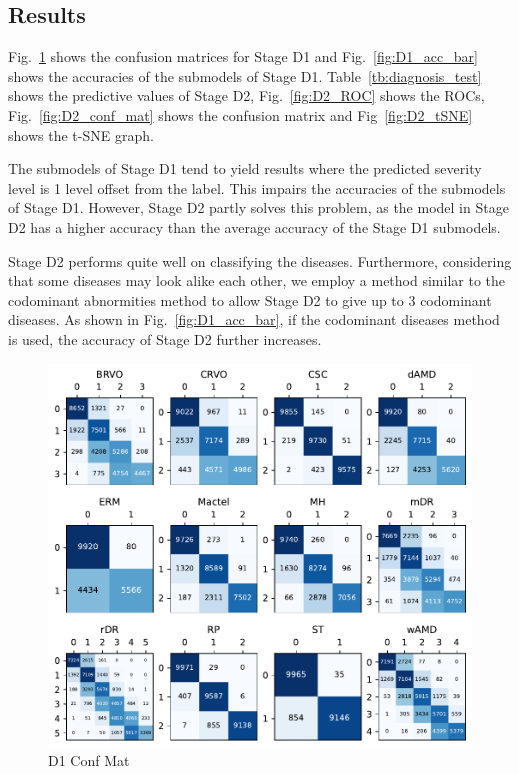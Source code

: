 \documentclass{article}
\begin{document}
	
	\subsection{Results}
	
	Fig.~\ref{fig:D1_conf_mat} shows the confusion matrices for Stage D1 and Fig.~\ref{fig:D1_acc_bar} shows the accuracies of the submodels of Stage D1. Table~\ref{tb:diagnosis_test} shows the predictive values of Stage D2, Fig.~\ref{fig:D2_ROC} shows the ROCs, Fig.~\ref{fig:D2_conf_mat} shows the confusion matrix and Fig~\ref{fig:D2_tSNE} shows the t-SNE graph.
	
	The submodels of Stage D1 tend to yield results where the predicted severity level is 1 level offset from the label. This impairs the accuracies of the submodels of Stage D1. However, Stage D2 partly solves this problem, as the model in Stage D2 has a higher accuracy than the average accuracy of the Stage D1 submodels. 
	
	Stage D2 performs quite well on classifying the diseases. Furthermore, considering that some diseases may look alike each other, we employ a method similar to the codominant abnormities method to allow Stage D2 to give up to 3 codominant diseases. As shown in Fig.~\ref{fig:D1_acc_bar}, if the codominant diseases method is used, the accuracy of Stage D2 further increases. 
	
	\begin{figure}[htbp]
		\centering
		\includegraphics[width=\linewidth]{Figs/diagnosis1_confusion_matrix.pdf}
		\caption{D1 Conf Mat}
		\vspace{0.3cm}
		\label{fig:D1_conf_mat}
	\end{figure}
	
\end{document}
